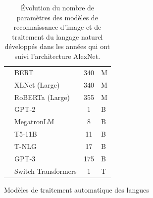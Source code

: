 \begin{table}[t]
\begin{subfigure}[b]{\textwidth}
\begin{tabular}{
      L{4.5cm}
      L{4.5cm}
      S[table-format=3.0, table-text-alignment=left]@{\,}
      s[table-unit-alignment=left]
    }
      \citet{devlin2019bert}         & BERT            & 340 & \si{M} \\
      \citet{yang2019xlnet}          & XLNet (Large)   & 340 & \si{M} \\
      \citet{liu2019roberta}         & RoBERTa (Large) & 355 & \si{M} \\
      \citet{radford2019language}    & GPT-2           &   1 & \si{B} \\
      \citet{shoeybi2019megatron}    & MegatronLM      &   8 & \si{B} \\
      \citet{raffel2020exploring}    & T5-11B          &  11 & \si{B} \\
      \citet{rosset2020turingnlg}    & T-NLG           &  17 & \si{B} \\
      \citet{brown2020language}      & GPT-3           & 175 & \si{B} \\
      \citet{fedus2021switch}        & Switch Transformers & 1 & \si{T} \\
      \bottomrule
    \end{tabular}
    \caption{Modèles de traitement automatique des langues}
    \label{table:ap7-networks_parameters_nlp}
  \end{subfigure}
  \par\bigskip
  \caption{Évolution du nombre de paramètres des modèles de reconnaissance d'image et de traitement du langage naturel développés dans les années qui ont suivi l'architecture AlexNet.}
  \label{table:ap7-networks_parameters}
\end{table}



